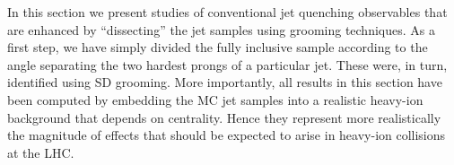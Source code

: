 
In this section we present studies of conventional jet quenching observables that are enhanced by ``dissecting'' the jet samples using grooming techniques. As a first step, we have simply divided the fully inclusive sample according to the angle separating the two hardest prongs of a particular jet. These were, in turn, identified using SD grooming.
More importantly, all results in this section have been computed by embedding the MC jet samples into a realistic heavy-ion background that depends on centrality. Hence they represent more realistically the magnitude of effects that should be expected to arise in heavy-ion collisions at the LHC.

